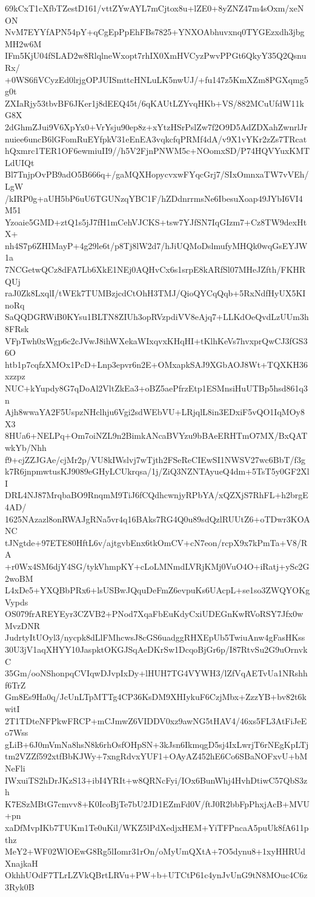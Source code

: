 69kCxT1cXfbTZestD161/vttZYwAYL7mCjtox8u+lZE0+8yZNZ47m4sOxm/xeNON
NvM7EYYfAPN54pY+qCgEpPpEhFBs7825+YNXOAbhuvxnq0TYGEzxdh3jbgMH2w6M
IFm5KjU04fSLAD2w8RlqlneWxopt7rhIX0XmHVCyzPwvPPGt6QkyY35Q2QsnuRx/
+0WS6fiVCyzEd0lrjgOPJUISmttcHNLuLK5nwUJ/+fu147z5KmXZm8PGXqmg5g0t
ZXIaRjy53tbvBF6JKer1j8dEEQ45t/6qKAUtLZYvqHKb+VS/882MCuUfdW11kG8X
2dGhmZJui9V6XpYx0+VrYsju90ep8z+xYtzHSrPslZw7f2O9D5AdZDXahZwnrlJr
nuiee6uncB6lGFomRuEYfpkV31eEnEA3vqkcfqPRMf4dA/v9X1vYKr2zZs7TRcat
hQxmrc1TER1OF6ewmiuII9//h5V2FjnPNWM5c+NOomxSD/P74HQVYuxKMTLdUIQt
Bl7TnjpOvPB9adO5B666q+/gaMQXHopycvxwFYqcGrj7/SIxOmnxaTW7vVEh/LgW
/kIRP0g+aUH5bP6uU6TGUNzqYBC1F/hZDdnrrmsNe6IbesuXoap49JYbI6VI4M51
Yzoaie5GMD+ztQ1s5jJ7fH1mCehVJCKS+tsw7YJfSN7IqGIzm7+Cz8TW9dexHtX+
nh4S7p6ZHIMayP+4g29le6t/p8Tj8lW2d7/hJiUQMoDslmufyMHQk0wqGsEYJW1a
7NCGetwQCz8dFA7Lb6XkE1NEj0AQHvCx6s1srpE8kARfSl07MHeJZfth/FKHRQUj
raJ0Zk8LxqlI/tWEk7TUMBzjcdCtOhH3TMJ/QioQYCqQqb+5RxNdfHyUX5KInoRq
SaQQDGRWiB0KYsu1BLTN8ZIUh3opRVzpdiVV8eAjq7+LLKdOeQvdLzUUm3h8FRsk
VFpTwh0xWgp6c2cJVwJ8ihWXekaWIxqvxKHqHI+tKlhKeVs7hvxprQwCJ3fGS36O
htb1p7cqfzXMOx1PcD+Lnp3epvr6n2E+OMxapkSAJ9XGbAOJ8Wt+TQXKH36xzzpz
NUC+kYupdy8G7qDoAl2VltZkEa3+oBZ5aePfrzEtp1ESMnsiHuUTBp5hsd861q3n
Ajh8wwaYA2F5UspzNHclhju6Vgi2sdWEbVU+LRjqlL8in3EDxiF5vQO1IqMOy8X3
8HUa6+NELPq+Om7oiNZL9n2BimkANcaBVYzu9bBAeERHTmO7MX/BxQATwkYb/Nhh
f9+cjZZJGAe/cjMr2p/VU8kIWslvj7wTjth2FSeReCIEwSI1NWSV27wc6BbT/f3g
k7R6jnpmwtusKJ9089eGHyLCUkrqsa/1j/ZiQ3NZNTAyueQ4dm+5TsT5y0GF2XlI
DRL4NJ87MrqbaBO9RnqmM9TiJ6fCQdhcwnjyRPbYA/xQZXjS7RhFL+h2brgE4AD/
1625NAzazl8onRWAJgRNa5vr4q16BAks7RG4Q0u89sdQzlRUUtZ6+oTDwr3KOANC
tJNgtde+97ETE80HftL6v/ajtgvbEnx6tkOmCV+cN7eon/rcpX9x7kPmTa+V8/RA
+r0Wx4SM6djY4SG/tykVhmpKY+cLoLMNmdLVRjKMj0VuO4O+iRatj+ySc2G2woBM
L4xDe5+YXQBbPRx6+lsUSBwJQquDeFmZ6evpuKs6UAcpL+se1so3ZWQYOKgVypds
OS079frAREYEyr3CZVB2+PNod7XqaFbEuKdyCxiUDEGnKwRVoRSY7Jfx0wMvzDNR
JudrtyItUOyl3/nycpk8dLlFMhcwsJ8cGS6uadggRHXEpUb5TwiuAnw4gFasHKss
30U3jV1aqXHYY10JaspktOKGJSqAeDKrSw1DcqoBjGr6p/I87RtvSu2G9uOrnvkC
35Gm/ooNShonpqCVIqwDJvpIxDy+lHUH7TG4VYWH3/lZfVqAETvUa1NRshhf6TrZ
Gm8Es9Ha0q/JcUnLTpMTTg4CP36KsDM9XHIykuF6CzjMbx+ZzzYB+bv82t6kwitI
2T1TDteNFPkwFRCP+mCJmwZ6VIDDV0xz9awNG5tHAV4/46xs5FL3AtFiJeEo7Wss
gLiB+6J0mVmNa8hsN8k6rhOsfOHpSN+3kJsn6IkmqgD5sj4IxLwrjT6rNEgKpLTj
tm2VZZf592xtfBbKJWy+7xngRdvxYUF1+OAyAZ452hE6Co6SBaNOFxvU+bMNeFli
IWxuiTS2hDrJKzS13+ibI4YRIt+w8QRNcFyi/IOx6BunWhj4HvhDtiwC57QbS3zh
K7ESzMBtG7cmvv8+K0IcoBjTe7bU2JD1EZmFd0V/ftJ0R2bbFpPhxjAcB+MVU+pn
xaDfMvpIKb7TUKm1Te0uKil/WKZ5lPdXedjxHEM+YiTFPncaA5puUk8fA611pthz
MeY2+WF02WlOEwG8Rg5lIomr31rOn/oMyUmQXtA+7O5dynu8+1xyHHRUdXnajkaH
OkhhUOdF7TLrLZVkQBrtLRVu+PW+b+UTCtP61c4ynJvUnG9tN8MOuc4C6z3Ryk0B
